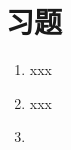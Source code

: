 \section{习题}\label{sec:习题07}
\begin{enumerate}
    \item xxx
    \item xxx
    \item \label{sub:7.11.3}\circletwo
\end{enumerate}